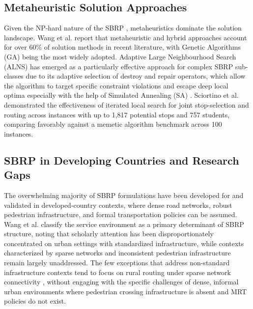 \documentclass[journal]{IEEEtran}
\begin{document}
\subsection{Metaheuristic Solution Approaches}

Given the NP-hard nature of the SBRP \cite{c1}, metaheuristics 
dominate the solution landscape. Wang et al. \cite{c4} report that 
metaheuristic and hybrid approaches account for over 60\% of 
solution methods in recent literature, with Genetic Algorithms (GA) 
being the most widely adopted. Adaptive Large Neighbourhood Search 
(ALNS) has emerged as a particularly effective approach for complex 
SBRP sub-classes due to its adaptive selection of destroy and repair 
operators, which allow the algorithm to target specific constraint 
violations and escape deep local optima especially with the help of Simulated Annealing (SA) \cite{c9}. Sciortino et al. 
\cite{c15} demonstrated the effectiveness of iterated local search 
for joint stop-selection and routing across instances with up to 
1,817 potential stops and 757 students, comparing favorably against 
a memetic algorithm benchmark \cite{c17} across 100 instances. 

\subsection{SBRP in Developing Countries and Research Gaps}

The overwhelming majority of SBRP formulations have been developed 
for and validated in developed-country contexts, where dense road 
networks, robust pedestrian infrastructure, and formal transportation 
policies can be assumed. Wang et al. \cite{c4} classify the service 
environment as a primary determinant of SBRP structure, noting that 
scholarly attention has been disproportionately concentrated on urban 
settings with standardized infrastructure, while contexts 
characterized by sparse networks and inconsistent pedestrian 
infrastructure remain largely unaddressed. The few exceptions that 
address non-standard infrastructure contexts tend to focus on rural 
routing under sparse network connectivity \cite{c18}, without 
engaging with the specific challenges of dense, informal urban 
environments where pedestrian crossing infrastructure is absent and 
MRT policies do not exist.
\end{document}
